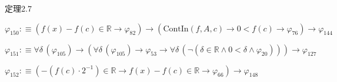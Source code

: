 \begin{fullproof}{定理2.7}
\begin{abbrevlist}
\item $\varphi_{150} :\equiv (f(x) - f(c) \in \mathbb{R} \to \varphi_{82}) \to (\mathrm{ContIn}(f,A,c) \to 0 < f(c) \to \varphi_{76}) \to \varphi_{144}$
\item $\varphi_{151} :\equiv \forall \delta\,(\varphi_{105}) \to (\forall \delta\,(\varphi_{105}) \to \varphi_{53} \to \forall \delta\,(\neg (\delta \in \mathbb{R} \land 0 < \delta \land \varphi_{20}))) \to \varphi_{127}$
\item $\varphi_{152} :\equiv (-(f(c) \cdot 2^{-1}) \in \mathbb{R} \to f(x) - f(c) \in \mathbb{R} \to \varphi_{66}) \to \varphi_{148}$
\end{abbrevlist}
\end{fullproof}
